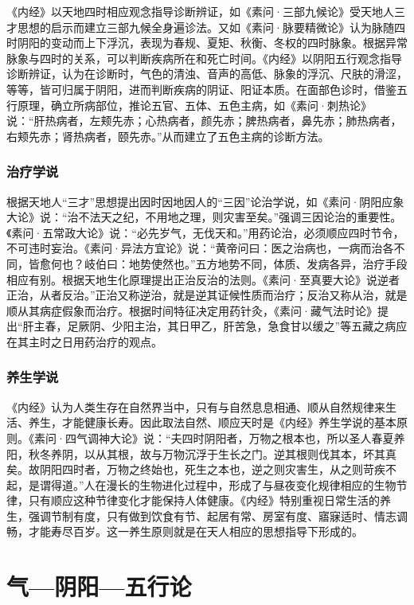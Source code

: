 \documentclass[draft,12pt]{ctexbook}
\begin{document}
《内经》以天地四时相应观念指导诊断辨证，如《素问·三部九候论》受天地人三才思想的启示而建立三部九候全身遍诊法。又如《素问·脉要精微论》认为脉随四时阴阳的变动而上下浮沉，表现为春规、夏矩、秋衡、冬权的四时脉象。根据异常脉象与四时的关系，可以判断疾病所在和死亡时间。《内经》以阴阳五行观念指导诊断辨证，认为在诊断时，气色的清浊、音声的高低、脉象的浮沉、尺肤的滑涩，等等，皆可归属于阴阳，进而判断疾病的阴证、阳证本质。在面部色诊时，借鉴五行原理，确立所病部位，推论五官、五体、五色主病，如《素问·刺热论》说：“肝热病者，左颊先赤；心热病者，颜先赤；脾热病者，鼻先赤；肺热病者，右颊先赤；肾热病者，颐先赤。”从而建立了五色主病的诊断方法。

\subsubsection{治疗学说}%

根据天地人“三才”思想提出因时因地因人的“三因”论治学说，如《素问·阴阳应象大论》说：“治不法天之纪，不用地之理，则灾害至矣。”强调三因论治的重要性。《素问·五常政大论》说：“必先岁气，无伐天和。”用药论治，必须顺应四时节令，不可违时妄治。《素问·异法方宜论》说：“黄帝问曰：医之治病也，一病而治各不同，皆愈何也？岐伯曰：地势使然也。”五方地势不同，体质、发病各异，治疗手段相应有别。根据天地生化原理提出正治反治的法则。《素问·至真要大论》说逆者正治，从者反治。”正治又称逆治，就是逆其证候性质而治疗；反治又称从治，就是顺从其病症假象而治疗。根据时间特征决定用药针灸，《素问·藏气法时论》提出“肝主春，足厥阴、少阳主治，其日甲乙，肝苦急，急食甘以缓之”等五藏之病应在其主时之日用药治疗的观点。

\subsubsection{养生学说}%

《内经》认为人类生存在自然界当中，只有与自然息息相通、顺从自然规律来生活、养生，才能健康长寿。因此取法自然、顺应天时是《内经》养生学说的基本原则。《素问·四气调神大论》说：“夫四时阴阳者，万物之根本也，所以圣人春夏养阳，秋冬养阴，以从其根，故与万物沉浮于生长之门。逆其根则伐其本，坏其真矣。故阴阳四时者，万物之终始也，死生之本也，逆之则灾害生，从之则苛疾不起，是谓得道。”人在漫长的生物进化过程中，形成了与昼夜变化规律相应的生物节律，只有顺应这种节律变化才能保持人体健康。《内经》特别重视日常生活的养生，强调节制有度，只有做到饮食有节、起居有常、房室有度、寤寐适时、情志调畅，才能寿尽百岁。这一养生原则就是在天人相应的思想指导下形成的。

\section{气—阴阳—五行论}%
\end{document}
